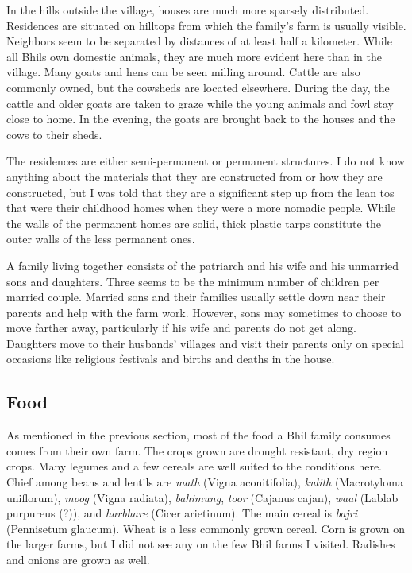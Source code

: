 \documentclass[report.tex]{subfiles}
\begin{document}
In the hills outside the village, houses are much more sparsely distributed. Residences are situated on hilltops from which the family's farm is usually visible. Neighbors seem to be separated by distances of at least half a kilometer. While all Bhils own domestic animals, they are much more evident here than in the village. Many goats and hens can be seen milling around. Cattle are also commonly owned, but the cowsheds are located elsewhere. During the day, the cattle and older goats are taken to graze while the young animals and fowl stay close to home. In the evening, the goats are brought back to the houses and the cows to their sheds.

The residences are either semi-permanent or permanent structures. I do not know anything about the materials that they are constructed from or how they are constructed, but I was told that they are a significant step up from the lean tos that were their childhood homes when they were a more nomadic people. While the walls of the permanent homes are solid, thick plastic tarps constitute the outer walls of the less permanent ones.

A family living together consists of the patriarch and his wife and his unmarried sons and daughters. Three seems to be the minimum number of children per married couple. Married sons and their families usually settle down near their parents and help with the farm work. However, sons may sometimes to choose to move farther away, particularly if his wife and parents do not get along. Daughters move to their husbands' villages and visit their parents only on special occasions like religious festivals and births and deaths in the house.

\subsection{Food}\label{subsec:food}

As mentioned in the previous section, most of the food a Bhil family consumes comes from their own farm. The crops grown are drought resistant, dry region crops. Many legumes and a few cereals are well suited to the conditions here. Chief among beans and lentils are \textit{math} (Vigna aconitifolia), \textit{kulith} (Macrotyloma uniflorum), \textit{moog} (Vigna radiata), \textit{bahimung}, \textit{toor} (Cajanus cajan), \textit{waal} (Lablab purpureus (?)), and \textit{harbhare} (Cicer arietinum). The main cereal is \textit{bajri} (Pennisetum glaucum). Wheat is a less commonly grown cereal. Corn is grown on the larger farms, but I did not see any on the few Bhil farms I visited. Radishes and onions are grown as well.
\end{document}
